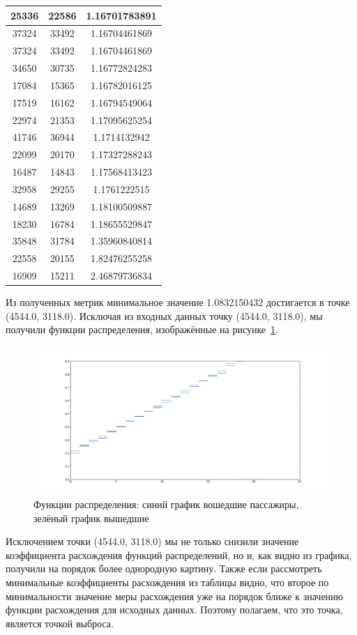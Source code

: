 \documentclass[12pt,a4paper,oneside]{extarticle}
\begin{document}
\begin{table}[ht!]
\begin{tabular}{|c|c|c|}
        25336 & 22586 & 1.16701783891 \\ \hline 
        37324 & 33492 & 1.16704461869 \\ \hline 
        37324 & 33492 & 1.16704461869 \\ \hline 
        34650 & 30735 & 1.16772824283 \\ \hline 
        17084 & 15365 & 1.16782016125 \\ \hline 
        17519 & 16162 & 1.16794549064 \\ \hline 
        22974 & 21353 & 1.17095625254 \\ \hline 
        41746 & 36944 & 1.1714132942 \\ \hline 
        22099 & 20170 & 1.17327288243 \\ \hline 
        16487 & 14843 & 1.17568413423 \\ \hline 
        32958 & 29255 & 1.1761222515 \\ \hline 
        14689 & 13269 & 1.18100509887 \\ \hline 
        18230 & 16784 & 1.18655529847 \\ \hline 
        35848 & 31784 & 1.35960840814 \\ \hline 
        22558 & 20155 & 1.82476255258 \\ \hline 
        16909 & 15211 & 2.46879736834 \\ \hline 

        \end{tabular}
    \end{table}

    Из полученных метрик минимальное значение 1.0832150432 достигается в точке (4544.0, 3118.0).
    Исключая из входных данных точку (4544.0, 3118.0), мы получили функции распределения, изображённые на рисунке~\ref{pic:case2}.
    \begin{figure}[ht!]
        \center
        \includegraphics[scale=0.45]{figure_2.png}
        \caption{Функции распределения: синий график вошедшие пассажиры, зелёный график вышедшие}
        \label{pic:case2}
    \end{figure}

    Исключением точки (4544.0, 3118.0) мы не только снизили значение коэффициента расхождения функций распределений, но и, как видно из графика, получили на порядок более однородную картину. Также если рассмотреть минимальные коэффициенты расхождения из таблицы видно, что второе по минимальности значение меры расхождения уже на порядок ближе к значению функции расхождения для исходных данных. Поэтому полагаем, что это точка, является точкой выброса.
\end{document}
